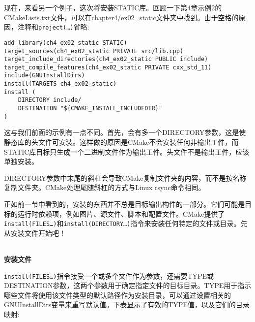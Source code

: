 现在，来看另一个例子，这次将安装STATIC库。回顾一下第4章示例2的CMakeLists.txt文件，可以在chapter4/ex02\_static文件夹中找到。由于空格的原因，注释和\texttt{project(…)}省略:

\begin{lstlisting}[style=styleCMake]
add_library(ch4_ex02_static STATIC)
target_sources(ch4_ex02_static PRIVATE src/lib.cpp)
target_include_directories(ch4_ex02_static PUBLIC include)
target_compile_features(ch4_ex02_static PRIVATE cxx_std_11)
include(GNUInstallDirs)
install(TARGETS ch4_ex02_static)
install (
	DIRECTORY include/
	DESTINATION "${CMAKE_INSTALL_INCLUDEDIR}"
)
\end{lstlisting}

这与我们前面的示例有一点不同。首先，会有多一个DIRECTORY参数，这是使静态库的头文件可安装。这样做的原因是CMake不会安装任何非输出工件，而STATIC库目标只生成一个二进制文件作为输出工件。头文件不是输出工件，应该单独安装。

\begin{tcolorbox}[colback=webgreen!5!white,colframe=webgreen!75!black,title=Note]
DIRECTORY参数中末尾的斜杠会导致CMake复制文件夹的内容，而不是按名称复制文件夹。CMake处理尾随斜杠的方式与Linux rsync命令相同。
\end{tcolorbox}


正如前一节中看到的，安装的东西并不总是目标输出构件的一部分。它们可能是目标的运行时依赖项，例如图片、源文件、脚本和配置文件。CMake提供了\texttt{install(FILES…)}和\texttt{install(DIRECTORY…)}指令来安装任何特定的文件或目录。先从安装文件开始吧！

\hspace*{\fill} \\ %
\noindent
\textbf{安装文件}
 
\texttt{install(FILES…)}指令接受一个或多个文件作为参数，还需要TYPE或DESTINATION参数，这两个参数用于确定指定文件的目标目录。TYPE用于指示哪些文件将使用该文件类型的默认路径作为安装目录，可以通过设置相关的GNUInstallDirs变量来重写默认值。下表显示了有效的TYPE值，以及它们的目录映射:

